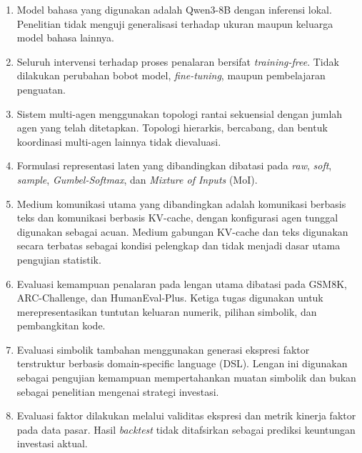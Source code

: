 \begin{enumerate}

\item Model bahasa yang digunakan adalah Qwen3-8B dengan inferensi lokal.
      Penelitian tidak menguji generalisasi terhadap ukuran maupun keluarga
      model bahasa lainnya.

\item Seluruh intervensi terhadap proses penalaran bersifat
      \textit{training-free}. Tidak dilakukan perubahan bobot model,
      \textit{fine-tuning}, maupun pembelajaran penguatan.

\item Sistem multi-agen menggunakan topologi rantai sekuensial dengan
      jumlah agen yang telah ditetapkan. Topologi hierarkis, bercabang, dan
      bentuk koordinasi multi-agen lainnya tidak dievaluasi.

\item Formulasi representasi laten yang dibandingkan dibatasi pada
      \textit{raw}, \textit{soft}, \textit{sample}, \textit{Gumbel-Softmax},
      dan \textit{Mixture of Inputs} (MoI).

\item Medium komunikasi utama yang dibandingkan adalah komunikasi berbasis
      teks dan komunikasi berbasis KV-cache, dengan konfigurasi agen tunggal
      digunakan sebagai acuan. Medium gabungan KV-cache dan teks digunakan
      secara terbatas sebagai kondisi pelengkap dan tidak menjadi dasar
      utama pengujian statistik.

\item Evaluasi kemampuan penalaran pada lengan utama dibatasi pada GSM8K,
      ARC-Challenge, dan HumanEval-Plus. Ketiga tugas digunakan untuk
      merepresentasikan tuntutan keluaran numerik, pilihan simbolik, dan
      pembangkitan kode.

\item Evaluasi simbolik tambahan menggunakan generasi ekspresi faktor
      terstruktur berbasis domain-specific language (DSL). Lengan ini
      digunakan sebagai pengujian kemampuan mempertahankan muatan simbolik
      dan bukan sebagai penelitian mengenai strategi investasi.

\item Evaluasi faktor dilakukan melalui validitas ekspresi dan metrik
      kinerja faktor pada data pasar. Hasil \textit{backtest} tidak
      ditafsirkan sebagai prediksi keuntungan investasi aktual.

\end{enumerate}


